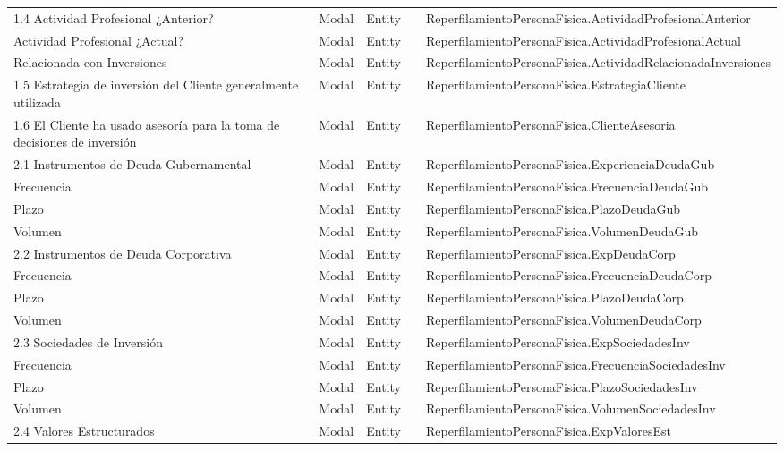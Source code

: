 \begin{table}[H]
{\begin{tabular}{ p{4cm} p{2cm} p{2cm} p{3cm} p{8cm} }
		1.4 Actividad Profesional ¿Anterior? &
		Modal &
		Entity &
		 &
		ReperfilamientoPersonaFisica.ActividadProfesionalAnterior \\
		Actividad Profesional ¿Actual? &
		Modal &
		Entity &
		 &
		ReperfilamientoPersonaFisica.ActividadProfesionalActual \\
		Relacionada con Inversiones &
		Modal &
		Entity &
		 &
		ReperfilamientoPersonaFisica.ActividadRelacionadaInversiones \\
		1.5 Estrategia de inversi\'on del Cliente generalmente utilizada &
		Modal &
		Entity &
		 &
		ReperfilamientoPersonaFisica.EstrategiaCliente \\
		1.6 El Cliente ha usado asesor\'ia para la toma de decisiones de inversi\'on &
		Modal &
		Entity &
		 &
		ReperfilamientoPersonaFisica.ClienteAsesoria \\
		2.1 Instrumentos de Deuda Gubernamental &
		Modal &
		Entity &
		 &
		ReperfilamientoPersonaFisica.ExperienciaDeudaGub \\
		Frecuencia &
		Modal &
		Entity &
		 &
		ReperfilamientoPersonaFisica.FrecuenciaDeudaGub \\
		Plazo &
		Modal &
		Entity &
		 &
		ReperfilamientoPersonaFisica.PlazoDeudaGub \\
		Volumen &
		Modal &
		Entity &
		 &
		ReperfilamientoPersonaFisica.VolumenDeudaGub \\
		2.2 Instrumentos de Deuda Corporativa &
		Modal &
		Entity &
		 &
		ReperfilamientoPersonaFisica.ExpDeudaCorp \\
		Frecuencia &
		Modal &
		Entity &
		 &
		ReperfilamientoPersonaFisica.FrecuenciaDeudaCorp \\
		Plazo &
		Modal &
		Entity &
		 &
		ReperfilamientoPersonaFisica.PlazoDeudaCorp \\
		Volumen &
		Modal &
		Entity &
		 &
		ReperfilamientoPersonaFisica.VolumenDeudaCorp \\
		2.3 Sociedades de Inversi\'on &
		Modal &
		Entity &
		 &
		ReperfilamientoPersonaFisica.ExpSociedadesInv \\
		Frecuencia &
		Modal &
		Entity &
		 &
		ReperfilamientoPersonaFisica.FrecuenciaSociedadesInv \\
		Plazo &
		Modal &
		Entity &
		 &
		ReperfilamientoPersonaFisica.PlazoSociedadesInv \\
		Volumen &
		Modal &
		Entity &
		 &
		ReperfilamientoPersonaFisica.VolumenSociedadesInv \\
		2.4 Valores Estructurados &
		Modal &
		Entity &
		 &
		ReperfilamientoPersonaFisica.ExpValoresEst \\

\end{tabular}}
\end{table}

